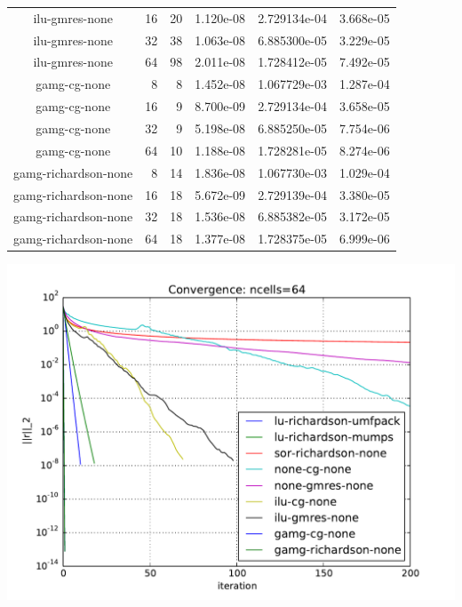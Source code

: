 \documentclass{article}\usepackage[T1]{fontenc}
\begin{document}
\begin{tabular}{crrlll}
ilu-gmres-none&16&20&1.120e-08&2.729134e-04&3.668e-05\\
ilu-gmres-none&32&38&1.063e-08&6.885300e-05&3.229e-05\\
ilu-gmres-none&64&98&2.011e-08&1.728412e-05&7.492e-05\\ \hline
gamg-cg-none&8&8&1.452e-08&1.067729e-03&1.287e-04\\
gamg-cg-none&16&9&8.700e-09&2.729134e-04&3.658e-05\\
gamg-cg-none&32&9&5.198e-08&6.885250e-05&7.754e-06\\
gamg-cg-none&64&10&1.188e-08&1.728281e-05&8.274e-06\\ \hline
gamg-richardson-none&8&14&1.836e-08&1.067730e-03&1.029e-04\\
gamg-richardson-none&16&18&5.672e-09&2.729139e-04&3.380e-05\\
gamg-richardson-none&32&18&1.536e-08&6.885382e-05&3.172e-05\\
gamg-richardson-none&64&18&1.377e-08&1.728375e-05&6.999e-06\\
\hline\end{tabular}

\includegraphics[width=\linewidth]{convergence.pdf}
\end{document}
